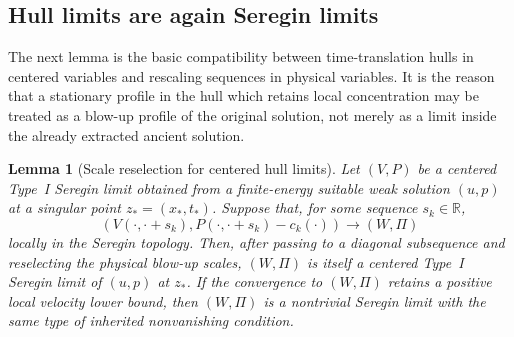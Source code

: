 \documentclass[11pt]{amsart}
\numberwithin{equation}{section}
\theoremstyle{plain}
\newtheorem{lemma}[lemma]{Lemma}
\theoremstyle{definition}
\theoremstyle{remark}
\begin{document}
\subsection{Hull limits are again Seregin limits}

The next lemma is the basic compatibility between time-translation hulls in
centered variables and rescaling sequences in physical variables.  It is the
reason that a stationary profile in the hull which retains local concentration
may be treated as a blow-up profile of the original solution, not merely as a
limit inside the already extracted ancient solution.

\begin{lemma}[Scale reselection for centered hull limits]
\label{lem:R3-hull-is-seregin}
Let \((V,P)\) be a centered Type~I Seregin limit obtained from a finite-energy
suitable weak solution \((u,p)\) at a singular point \(z_*=(x_*,t_*)\).  Suppose
that, for some sequence \(s_k\in\mathbb R\),
\[
   (V(\cdot,\cdot+s_k),P(\cdot,\cdot+s_k)-c_k(\cdot))
   \to (W,\Pi)
\]
locally in the Seregin topology.  Then, after passing to a diagonal subsequence
and reselecting the physical blow-up scales, \((W,\Pi)\) is itself a centered
Type~I Seregin limit of \((u,p)\) at \(z_*\).  If the convergence to \((W,\Pi)\)
retains a positive local velocity lower bound, then \((W,\Pi)\) is a nontrivial
Seregin limit with the same type of inherited nonvanishing condition.
\end{lemma}
\end{document}
